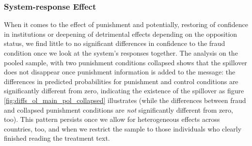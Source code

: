 \documentclass[11pt, ngerman,english,a4]{article}
\begin{document}



\subsubsection*{System-response Effect}


When it comes to the effect of punishment and potentially, restoring of confidence in institutions or deepening of detrimental effects depending on the opposition status, we find little to no significant differences in confidence to the fraud condition once we look at the system's responses together. 
The analysis on the pooled sample, with two punishment conditions collapsed shows that the spillover does not disappear once punishment information is added to the message: the differences in predicted probabilities for punishment and control conditions are significantly different from zero, indicating the existence of the spillover as figure \ref{fig:diffs_ol_main_pol_collapsed} illustrates (while the differences between fraud and collapsed punishment conditions are \textit{not} significantly different from zero, too). 
This pattern persists once we allow for heterogeneous effects across countries, too, and when we restrict the sample to those individuals who clearly finished reading the treatment text. 
\end{document}
